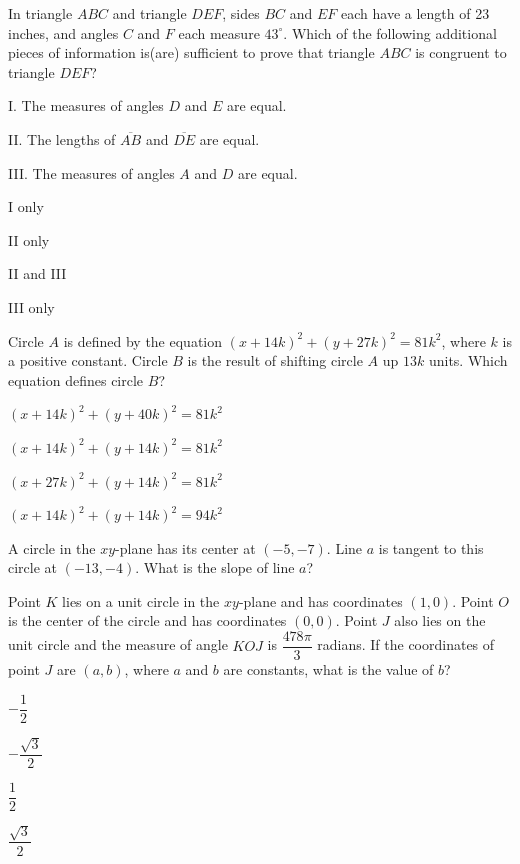 \vfill
\noindent\begin{minipage}{\linewidth}
\par\smallskip
In triangle $ABC$ and triangle $DEF$, sides $BC$ and $EF$ each have a length of 23 inches, and angles $C$ and $F$ each measure $43^\circ$. Which of the following additional pieces of information is(are) sufficient to prove that triangle $ABC$ is congruent to triangle $DEF$?\par\smallskip I. The measures of angles $D$ and $E$ are equal.\par II. The lengths of $\overline{AB}$ and $\overline{DE}$ are equal.\par III. The measures of angles $A$ and $D$ are equal.
\begin{satchoices}
  \item[A)] I only
  \item[B)] II only
  \item[C)] II and III
  \item[D)] III only
\end{satchoices}
\end{minipage}
\vfill
\clearpage
\noindent\begin{minipage}{\linewidth}
\par\smallskip
Circle $A$ is defined by the equation $(x+14k)^2+(y+27k)^2=81k^2$, where $k$ is a positive constant. Circle $B$ is the result of shifting circle $A$ up $13k$ units. Which equation defines circle $B$?
\begin{satchoices}
  \item[A)] $(x+14k)^2+(y+40k)^2=81k^2$
  \item[B)] $(x+14k)^2+(y+14k)^2=81k^2$
  \item[C)] $(x+27k)^2+(y+14k)^2=81k^2$
  \item[D)] $(x+14k)^2+(y+14k)^2=94k^2$
\end{satchoices}
\end{minipage}
\vfill
\noindent\begin{minipage}{\linewidth}
\par\smallskip
A circle in the $xy$-plane has its center at $(-5,-7)$. Line $a$ is tangent to this circle at $(-13,-4)$. What is the slope of line $a$?
\end{minipage}
\vfill
\noindent\begin{minipage}{\linewidth}
\par\smallskip
Point $K$ lies on a unit circle in the $xy$-plane and has coordinates $(1,0)$. Point $O$ is the center of the circle and has coordinates $(0,0)$. Point $J$ also lies on the unit circle and the measure of angle $KOJ$ is $\dfrac{478\pi}{3}$ radians. If the coordinates of point $J$ are $(a,b)$, where $a$ and $b$ are constants, what is the value of $b$?
\begin{satchoices}
  \item[A)] $-\dfrac{1}{2}$
  \item[B)] $-\dfrac{\sqrt{3}}{2}$
  \item[C)] $\dfrac{1}{2}$
  \item[D)] $\dfrac{\sqrt{3}}{2}$
\end{satchoices}
\end{minipage}
